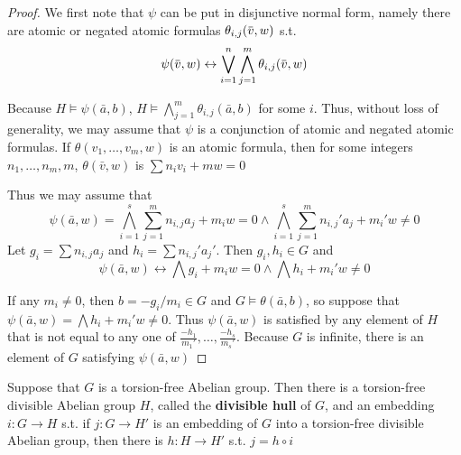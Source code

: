 \documentclass[11pt]{article}
\begin{document}
\begin{proof}
We first note that \(\psi\) can be put in disjunctive normal form, namely there are atomic or negated
atomic formulas \(\theta_{i,j}(\barv,w)\) s.t.
\begin{equation*}
\psi(\barv,w)\leftrightarrow\bigvee_{i=1}^n\bigwedge_{j=1}^m\theta_{i,j}(\barv,w)
\end{equation*}

Because \(H\vDash\psi(\bar{a},b)\),
\(H\vDash\bigwedge_{j=1}^m\theta_{i,j}(\bar{a},b)\) for some \(i\). Thus, without
loss of generality, we may assume that \(\psi\) is a conjunction of atomic and
negated atomic formulas. If \(\theta(v_1,\dots,v_m,w)\) is an atomic formula,
then for some integers \(n_1,\dots,n_m,m\), \(\theta(\bar{v},w)\) is
\(\sum n_iv_i+mw=0\)

Thus we may assume that
\begin{equation*}
\psi(\bar{a},w)=\displaystyle\bigwedge_{i=1}^s\sum_{j=1}^mn_{i,j}a_j+m_iw=0\wedge
\bigwedge_{i=1}^s\sum_{j=1}^mn_{i,j}'a_j+m_i'w\neq0
\end{equation*}
Let \(g_i=\sum n_{i,j}a_j\) and \(h_i=\sum n_{i,j}'a_j'\). Then \(g_i,h_i\in G\) and
\begin{equation*}
\psi(\bar{a},w)\leftrightarrow\bigwedge g_i+m_iw=0\wedge\bigwedge h_i+m_i'w\neq0
\end{equation*}

If any \(m_i\neq0\), then \(b=-g_i/m_i\in G\) and \(G\vDash\theta(\bar{a},b)\),
so suppose that \(\psi(\bar{a},w)=\bigwedge h_i+m_i'w\neq0\). Thus
\(\psi(\bar{a},w)\) is satisfied by any element of \(H\) that is not equal to
any one of \(\frac{-h_1}{m_1'},\dots,\frac{-h_s}{m_s'}\). Because \(G\) is
infinite, there is an element  of \(G\) satisfying \(\psi(\bar{a},w)\)
\end{proof}

\begin{lemma}[]
\label{lemma3.1.8}
Suppose that \(G\) is a torsion-free Abelian group. Then there is a
torsion-free divisible Abelian group \(H\), called the \textbf{divisible hull} of
\(G\), and an embedding \(i:G\to H\) s.t. if \(j:G\to H'\) is an embedding of
\(G\) into a torsion-free divisible Abelian group, then there is \(h:H\to H'\) s.t.
\(j=h\circ i\)
\end{lemma}
\end{document}
